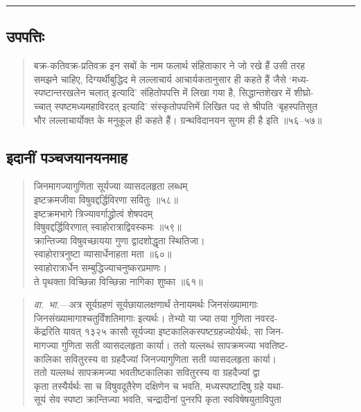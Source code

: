 \documentclass[11pt,a4paper]{article}
\newcommand{\longline}{\noindent\rule{\textwidth}{0.4pt}}
\newcommand{\dev}[1]{{\devanagarifont #1}}
\newenvironment{shloka}{%
  \begin{quote}
  \small
  \setlength{\leftmargin}{2em}
  \devanagarifont
}{\end{quote}}
\newenvironment{vyakhya}{%
  \begin{quote}
  \small
  \setlength{\leftmargin}{1em}
  \devanagarifont
}{\end{quote}}
\newcommand{\skt}[1]{{\devanagarifont #1}}
\begin{document}
\longline

\subsection{\dev{उपपत्तिः}}

\begin{vyakhya}
\skt{बक्र-कतिवक्र-प्रतिवक्र इन सबों के नाम फलार्थ संहिताकार ने जो रखे हैं उसी तरह}\\
\skt{समझने चाहिए, दिग्यर्थीबुद्धिद मे लल्लाचार्य आचार्यकतानुसार ही कहते हैं जैसे ‘मध्य-}\\
\skt{स्पष्टान्तरखलेन चलात् इत्यादि’ संहितोपपत्ति में लिखा गया है, सिद्धान्तशेखर में शीघ्रो-}\\
\skt{च्चात् स्पष्टमध्यमहाविरदत् इत्यादि’ संस्कृतोपपत्तिमें लिखित पद से श्रीपति ‘बृहस्पतिसुत}\\
\skt{भौर लल्लाचार्योक्त के मनुकूल ही कहते हैं। ग्रन्थविदानयन सुगम ही है इति ॥५६--५७॥}
\end{vyakhya}

\subsection{\dev{इदानीं पञ्चजयानयनमाह}}

\begin{shloka}
\skt{जिनमागज्यागुणिता सूर्यज्या व्यासदलहृता लब्धम्}\\
\skt{इष्टक्रमजीवा विषुवद्दर्द्धिविरणा सवितुः ॥५८॥}\\[0.3em]
\skt{इष्टक्रमभागे त्रिज्यावर्गाद्ध्रोत्वं शेषपदम्}\\
\skt{विषुवद्दर्द्धिविरणात् स्वाहोरात्राद्विवस्कमः ॥५९॥}\\[0.3em]
\skt{क्रान्तिज्या विषुवच्छायया गुणा द्वादशोद्धृता स्थितिजा।}\\
\skt{स्वाहोरात्रनुष्टा व्यासार्धेनाहता मता ॥६०॥}\\[0.3em]
\skt{स्वाहोरात्रार्धेन सम्बुद्धिज्याचनुष्करप्रमाणः।}\\
\skt{ते पृथक्ता विच्छिन्ना विच्छिन्ना नागिका शुष्का ॥६१॥}
\end{shloka}

\begin{vyakhya}
\textit{वा.\ भा.}—\skt{अत्र सूर्यग्रहणं सूर्यछायालक्षणार्थं तेनायमर्थः जिनसंख्यामागाः}\\
\skt{जिनसंख्यामागाश्चतुर्विंशतिमागाः इत्यर्थः। तेभ्यो या ज्या तया गुणिता नवरद-}\\
\skt{केंद्ररिति यावत् १३२५ कासौ सूर्यज्या इष्टकालिकस्पष्टग्रहज्योर्यर्थः, सा जिन-}\\
\skt{मागज्या गुणिता सती व्यासदलहृता कार्या। ततो यल्लब्धं सापक्रमज्या भवतिष्ट-}\\
\skt{कालिका सवितुरस्य वा ग्रहदैज्यां जिनज्यागुणिता सती व्यासदलहृता कार्या।}\\
\skt{ततो यल्लब्धं सापक्रमज्या भवतीष्टकालिका सवितुरस्य वा ग्रहदैज्यां द्वा}\\
\skt{कृता तस्यैर्यर्थः सा च विषुवदूतैरेण दक्षिणेन च भवति, मध्यस्पष्टादिषु ग्रहे यथा-}\\
\skt{सूयं सेव स्पष्टा क्रान्तिज्या भवति, चन्द्रादीनां पुनरपि कृता स्वविषेषयुताविपुता}
\end{vyakhya}
\end{document}
